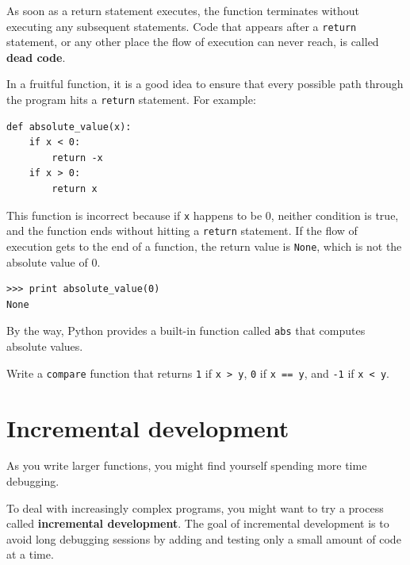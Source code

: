 \documentclass[10pt]{book}
\begin{document}
As soon as a return statement executes, the function
terminates without executing any subsequent statements.
Code that appears after a {\tt return} statement, or any other place
the flow of execution can never reach, is called {\bf dead code}.


In a fruitful function, it is a good idea to ensure
that every possible path through the program hits a
{\tt return} statement.  For example:

\beforeverb
\begin{verbatim}
def absolute_value(x):
    if x < 0:
        return -x
    if x > 0:
        return x
\end{verbatim}
\afterverb
%
This function is incorrect because if {\tt x} happens to be 0,
neither condition is true, and the function ends without hitting a
{\tt return} statement.  If the flow of execution gets to the end
of a function, the return value is {\tt None}, which is not
the absolute value of 0.


\beforeverb
\begin{verbatim}
>>> print absolute_value(0)
None
\end{verbatim}
\afterverb
%
By the way, Python provides a built-in function called 
{\tt abs} that computes absolute values.


\begin{ex}


Write a {\tt compare} function
that returns {\tt 1} if {\tt x > y},
{\tt 0} if {\tt x == y}, and {\tt -1} if {\tt x < y}.
\end{ex}


\section{Incremental development}
\label{incremental development}

As you write larger functions, you might find yourself
spending more time debugging.

To deal with increasingly complex programs,
you might want to try a process called
{\bf incremental development}.  The goal of incremental development
is to avoid long debugging sessions by adding and testing only
a small amount of code at a time.
\end{document}
